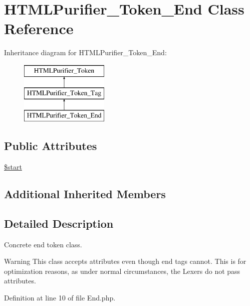 \hypertarget{classHTMLPurifier__Token__End}{\section{H\+T\+M\+L\+Purifier\+\_\+\+Token\+\_\+\+End Class Reference}
\label{classHTMLPurifier__Token__End}
}
Inheritance diagram for H\+T\+M\+L\+Purifier\+\_\+\+Token\+\_\+\+End\+:\begin{figure}[H]
\begin{center}
\leavevmode
\includegraphics[height=3.000000cm]{classHTMLPurifier__Token__End}
\end{center}
\end{figure}
\subsection*{Public Attributes}
\begin{DoxyCompactItemize}
\item 
\hyperlink{classHTMLPurifier__Token__End_a07ce05890f8dd957bb9bc6822cb540ba}{\$start}
\end{DoxyCompactItemize}
\subsection*{Additional Inherited Members}


\subsection{Detailed Description}
Concrete end token class.

\begin{DoxyWarning}{Warning}
This class accepts attributes even though end tags cannot. This is for optimization reasons, as under normal circumstances, the Lexers do not pass attributes. 
\end{DoxyWarning}


Definition at line 10 of file End.\+php.



